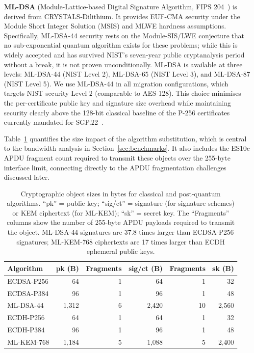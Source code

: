 \documentclass[a4paper,fleqn]{cas-sc}
\begin{document}
\textbf{ML-DSA} (Module-Lattice-based Digital Signature Algorithm,
FIPS 204~\cite{nist_fips204}) is derived from CRYSTALS-Dilithium. It
provides EUF-CMA security under the Module Short Integer Solution (MSIS)
and MLWE hardness assumptions. Specifically, ML-DSA-44 security rests on the
Module-SIS/LWE conjecture that no sub-exponential quantum algorithm exists for
these problems; while this is widely accepted and has survived NIST's seven-year
public cryptanalysis period without a break, it is not proven unconditionally.
ML-DSA is available at three levels:
ML-DSA-44 (NIST Level 2), ML-DSA-65 (NIST Level 3), and ML-DSA-87
(NIST Level 5). We use ML-DSA-44 in all migration configurations, which
targets NIST security Level 2 (comparable to AES-128). This choice
minimises the per-certificate public key and signature size overhead
while maintaining security clearly above the 128-bit classical baseline
of the P-256 certificates currently mandated for SGP.22~\cite{demir2025pqc}.

Table~\ref{tab:pqc_sizes} quantifies the size impact of the algorithm
substitution, which is central to the bandwidth analysis in
Section~\ref{sec:benchmarks}. It also includes the ES10c APDU fragment count
required to transmit these objects over the 255-byte interface limit, connecting
directly to the APDU fragmentation challenges discussed later.

\begin{table}[!htb]
\caption{Cryptographic object sizes in bytes for classical and
  post-quantum algorithms. ``pk'' = public key; ``sig/ct'' = signature
  (for signature schemes) or KEM ciphertext (for ML-KEM); ``sk'' =
  secret key. The ``Fragments'' columns show the number of 255-byte APDU payloads
  required to transmit the object. ML-DSA-44 signatures are 37.8 times larger than
  ECDSA-P256 signatures; ML-KEM-768 ciphertexts are 17 times larger
  than ECDH ephemeral public keys.}
\label{tab:pqc_sizes}
\centering
\footnotesize
\setlength{\tabcolsep}{4pt}
\renewcommand{\arraystretch}{1.1}
\begin{tabular}{@{}lrrrrr@{}}
\toprule
\textbf{Algorithm} & \textbf{pk (B)} & \textbf{Fragments} & \textbf{sig/ct (B)} & \textbf{Fragments} & \textbf{sk (B)} \\
\midrule
ECDSA-P256  & 64    & 1 & 64      & 1  & 32 \\
ECDSA-P384  & 96    & 1 & 96      & 1  & 48 \\
ML-DSA-44   & 1{,}312 & 6 & 2{,}420 & 10 & 2{,}560 \\
\midrule
ECDH-P256   & 64    & 1 & 64      & 1  & 32 \\
ECDH-P384   & 96    & 1 & 96      & 1  & 48 \\
ML-KEM-768  & 1{,}184 & 5 & 1{,}088 & 5  & 2{,}400 \\
\bottomrule
\end{tabular}
\end{table}
\end{document}
